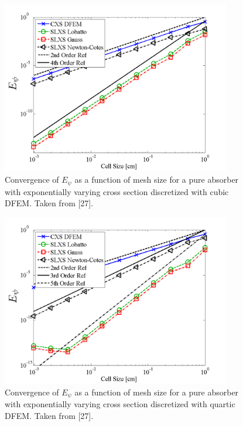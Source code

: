 \begin{figure}[!htp]
\centering
\includegraphics[width=10cm]{chapter3_variable_xs/P3_VarXS_E_psi_L2.png}
\caption{Convergence of $E_{\psi}$  as a function of mesh size for a pure absorber with exponentially varying cross section discretized with cubic DFEM.  Taken from [27].}
\label{fig:varxs_psi_L2_p3}
\end{figure}
%
\begin{figure}[!hbp]
\centering
\includegraphics[width=10cm]{chapter3_variable_xs/P4_VarXS_E_psi_L2.png}
\caption{Convergence of $E_{\psi}$  as a function of mesh size for a pure absorber with exponentially varying cross section discretized with quartic DFEM.  Taken from [27].}
\label{fig:varxs_psi_L2_p4}
\end{figure}



